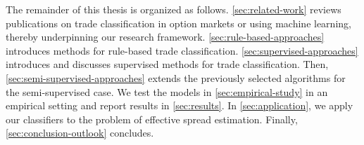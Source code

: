 The remainder of this thesis is organized as follows. \cref{sec:related-work} reviews publications on trade classification in option markets or using machine learning, thereby underpinning our research framework. \cref{sec:rule-based-approaches} introduces methods for rule-based trade classification. \cref{sec:supervised-approaches} introduces and discusses supervised methods for trade classification. Then, \cref{sec:semi-supervised-approaches} extends the previously selected algorithms for the semi-supervised case. We test the models in \cref{sec:empirical-study} in an empirical setting and report results in \cref{sec:results}. In \cref{sec:application}, we apply our classifiers to the problem of effective spread estimation. Finally, \cref{sec:conclusion-outlook} concludes.
